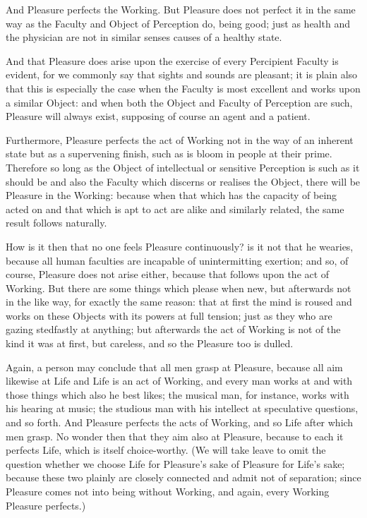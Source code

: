 And Pleasure perfects the Working. But Pleasure does not perfect it in the same
way as the Faculty and Object of Perception do, being good; just as health and
the physician are not in similar senses causes of a healthy state.

And that Pleasure does arise upon the exercise of every Percipient Faculty is
evident, for we commonly say that sights and sounds are pleasant; it is plain
also that this is especially the case when the Faculty is most excellent and
works upon a similar Object: and when both the Object and Faculty of Perception
are such, Pleasure will always exist, supposing of course an agent and a
patient.

Furthermore, Pleasure perfects the act of Working not in the way of an inherent
state but as a supervening finish, such as is bloom in people at their prime.
Therefore so long as the Object of intellectual or sensitive Perception is such
as it should be and also the Faculty which discerns or realises the Object,
there will be Pleasure in the Working: because when that which has the capacity
of being acted on and that which is apt to act are alike and similarly related,
the same result follows naturally.

How is it then that no one feels Pleasure continuously? is it not that he
wearies, because all human faculties are incapable of unintermitting exertion;
and so, of course, Pleasure does not arise either, because that follows upon
the act of Working. But there are some things which please when new, but
afterwards not in the like way, for exactly the same reason: that at first the
mind is roused and works on these Objects with its powers at full tension; just
as they who are gazing stedfastly at anything; but afterwards the act of
Working is not of the kind it was at first, but careless, and so the Pleasure
too is dulled.

Again, a person may conclude that all men grasp at Pleasure, because all aim
likewise at Life and Life is an act of Working, and every man works at and with
those things which also he best likes; the musical man, for instance, works
with his hearing at music; the studious man with his intellect at speculative
questions, and so forth. And Pleasure perfects the acts of Working, and so Life
after which men grasp. No wonder then that they aim also at Pleasure, because
to each it perfects Life, which is itself choice-worthy. (We will take leave to
omit the question whether we choose Life for Pleasure’s sake of Pleasure
for Life’s sake; because these two plainly are closely connected and
admit not of separation; since Pleasure comes not into being without Working,
and again, every Working Pleasure perfects.)

